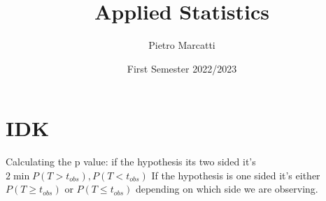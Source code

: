 \documentclass{article}
\title{Applied Statistics}
\author{Pietro Marcatti}
\date{First Semester 2022/2023}
\begin{document}
\maketitle
\section*{IDK}
Calculating the p value: if the hypothesis its two sided it's $ 2 \min{P(T>t_{obs}), P(T<t_{obs})} $ If the hypothesis is one sided it's either $ P(T\geq t_{obs}) $ or $ P(T\leq t_{obs}) $ depending on which side we are observing.
\end{document}
